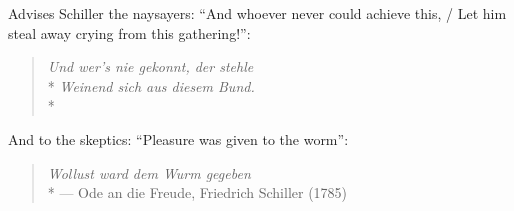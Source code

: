 Advises Schiller the naysayers:
``And whoever never could achieve this, / Let him steal away crying from this gathering!'':
\begin{verse}
	\emph{Und wer's nie gekonnt, der stehle}\\*
	\emph{Weinend sich aus diesem Bund.}\\*
\end{verse}

And to the skeptics:
``Pleasure was given to the worm'':
\begin{verse}
	\emph{Wollust ward dem Wurm gegeben}\\*
	--- Ode an die Freude, Friedrich Schiller (1785)
\end{verse} %